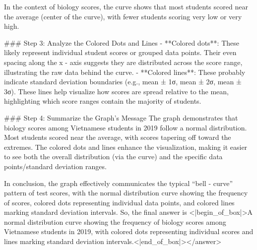 In the context of biology scores, the curve shows that most students scored near the average (center of the curve), with fewer students scoring very low or very high.  

### Step 3: Analyze the Colored Dots and Lines  
- **Colored dots**: These likely represent individual student scores or grouped data points. Their even spacing along the x - axis suggests they are distributed across the score range, illustrating the raw data behind the curve.  
- **Colored lines**: These probably indicate standard deviation boundaries (e.g., mean ± 1σ, mean ± 2σ, mean ± 3σ). These lines help visualize how scores are spread relative to the mean, highlighting which score ranges contain the majority of students.  

### Step 4: Summarize the Graph’s Message  
The graph demonstrates that biology scores among Vietnamese students in 2019 follow a normal distribution. Most students scored near the average, with scores tapering off toward the extremes. The colored dots and lines enhance the visualization, making it easier to see both the overall distribution (via the curve) and the specific data points/standard deviation ranges.  

In conclusion, the graph effectively communicates the typical “bell - curve” pattern of test scores, with the normal distribution curve showing the frequency of scores, colored dots representing individual data points, and colored lines marking standard deviation intervals.  
So, the final answer is <|begin_of_box|>A normal distribution curve showing the frequency of biology scores among Vietnamese students in 2019, with colored dots representing individual scores and lines marking standard deviation intervals.<|end_of_box|></answer>